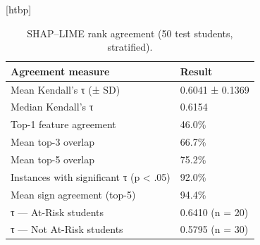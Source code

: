 \begin{table}
\small[htbp]
\caption{SHAP–LIME rank agreement (50 test students, stratified).}
\label{tab:T11_shap_lime_agreement}
\begin{tabular}{ll}
\toprule
Agreement measure & Result \\
\midrule
Mean Kendall's τ (± SD) & 0.6041 ± 0.1369 \\
Median Kendall's τ & 0.6154 \\
Top-1 feature agreement & 46.0\% \\
Mean top-3 overlap & 66.7\% \\
Mean top-5 overlap & 75.2\% \\
Instances with significant τ (p < .05) & 92.0\% \\
Mean sign agreement (top-5) & 94.4\% \\
τ — At-Risk students & 0.6410 (n = 20) \\
τ — Not At-Risk students & 0.5795 (n = 30) \\
\bottomrule
\end{tabular}
\end{table}
